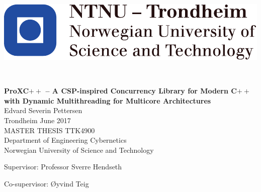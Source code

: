 
\thispagestyle{empty}

\begin{center}
\includegraphics{fig/NTNU}
\end{center}

\mbox{}\\[6pc]
\begin{center}
\Huge\textbf{ProXC$++$ -- A CSP\hyp{}inspired Concurrency Library for Modern C$++$ with Dynamic Multithreading for Multicore Architectures}\\[2pc]

\Large{Edvard Severin Pettersen}\\[1pc]
\large{Trondheim June 2017}\\[2pc]

MASTER THESIS TTK4900\\
Department of Engineering Cybernetics\\
Norwegian University of Science and Technology
\end{center}
\vfill

\noindent Supervisor: Professor Sverre Hendseth

\noindent Co-supervisor: Øyvind Teig

\afterpage{\blankpage}

